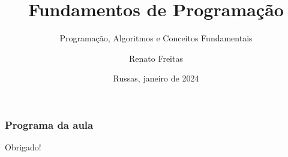 \documentclass[11pt]{beamer}
\begin{document}
	\title{Fundamentos de Programação}
	\subtitle{Programação, Algoritmos e Conceitos Fundamentais}
	\author{Renato Freitas}
	\date{Russas, janeiro de 2024}
	\begin{frame}[plain]
		\maketitle
	\end{frame}
	
	
	\begin{frame}
		\frametitle{Programa da aula}
		\tableofcontents
	\end{frame}


   



\begin{frame}[plain]
	\maketitle
	\centering
	Obrigado!
\end{frame}
\end{document}
